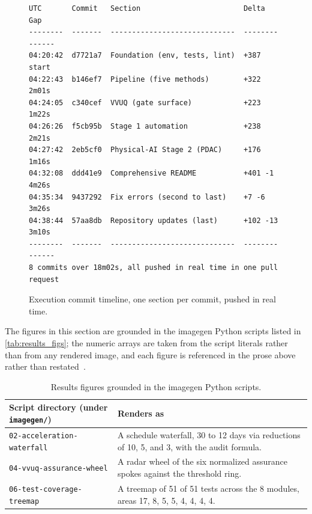 \begin{figure}[H]
\centering
\begin{verbatim}
UTC       Commit   Section                        Delta     Gap
--------  -------  -----------------------------  --------  ------
04:20:42  d7721a7  Foundation (env, tests, lint)  +387      start
04:22:43  b146ef7  Pipeline (five methods)        +322      2m01s
04:24:05  c340cef  VVUQ (gate surface)            +223      1m22s
04:26:26  f5cb95b  Stage 1 automation             +238      2m21s
04:27:42  2eb5cf0  Physical-AI Stage 2 (PDAC)     +176      1m16s
04:32:08  ddd41e9  Comprehensive README           +401 -1   4m26s
04:35:34  9437292  Fix errors (second to last)    +7 -6     3m26s
04:38:44  57aa8db  Repository updates (last)      +102 -13  3m10s
--------  -------  -----------------------------  --------  ------
8 commits over 18m02s, all pushed in real time in one pull request
\end{verbatim}
\caption{Execution commit timeline, one section per commit, pushed in real time.}
\label{figtimeline}
\end{figure}

The figures in this section are grounded in the imagegen Python scripts listed in
\autoref{tab:results_figs}; the numeric arrays are taken from the script literals
rather than from any rendered image, and each figure is referenced in the prose
above rather than restated~\cite{sel2025vvuq}.

\begin{table}[H]
\caption{Results figures grounded in the imagegen Python scripts.}
\label{tab:results_figs}
\centering
\begin{tabularx}{\textwidth}{L{4.8cm} >{\raggedright\arraybackslash}X}
\toprule
\textbf{Script directory (under \texttt{imagegen/})} & \textbf{Renders as} \\
\midrule
  \texttt{02-acceleration-waterfall} & A schedule waterfall, 30 to 12 days via reductions of 10, 5, and 3, with the audit formula. \\
  \texttt{04-vvuq-assurance-wheel} & A radar wheel of the six normalized assurance spokes against the threshold ring. \\
  \texttt{06-test-coverage-treemap} & A treemap of 51 of 51 tests across the 8 modules, areas 17, 8, 5, 5, 4, 4, 4, 4. \\
\bottomrule
\end{tabularx}
\end{table}

